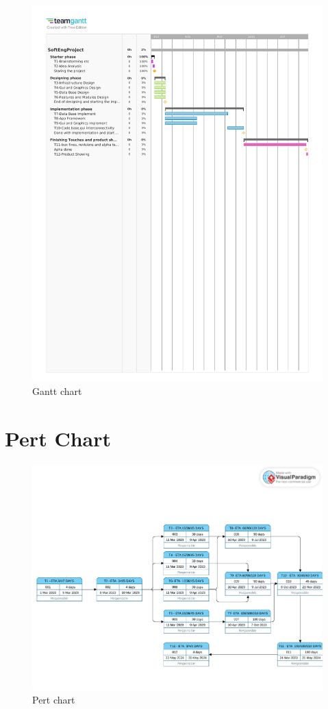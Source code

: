 \documentclass[11pt]{scrartcl} %
\begin{document}
\begin{figure}[ht]
    \hspace{-3.3cm}
    \includegraphics[trim = 0cm 12cm 0cm 2cm, clip]{assets/GanttForActualJob.pdf}
    \caption{Gantt chart}
\end{figure}
\pagebreak

\section{Pert Chart}
\begin{figure}[ht]
    \hspace{-1.7cm}
    \includegraphics[width = 1.2\linewidth,trim = 0cm 0cm 0cm 3cm, clip]{assets/PertForActualJob.pdf}
    \caption{Pert chart}
\end{figure}
\end{document}
